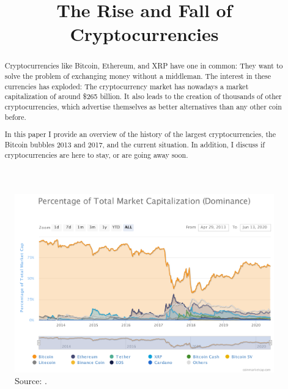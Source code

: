 \documentclass[11pt,a4paper,compsoc,conference]{IEEEtran}
\begin{document}
\title{\Huge{The Rise and Fall of Cryptocurrencies}}

\author{
}

\maketitle
\thispagestyle{plain}
\pagestyle{plain}


\begin{abstract}
Cryptocurrencies like Bitcoin, Ethereum, and XRP have one in common: They want to solve the problem of exchanging money without a middleman. The interest in these currencies has exploded: The cryptocurrency market has nowadays a market capitalization of around \$265 billion. It also leads to the creation of thousands of other cryptocurrencies, which advertise themselves as better alternatives than any other coin before. 

In this paper I provide an overview of the history of the largest cryptocurrencies, the Bitcoin bubbles 2013 and 2017, and the current situation. In addition, I discuss if cryptocurrencies are here to stay, or are going away soon. 

\end{abstract}

\begin{figure}
    \centering
    \includegraphics[width=\textwidth,draft=False]{figures/percentage-of-total-mark.pdf}
    \caption[Market Dominance]{Source: \citep{coinmarketcap}.}
    \label{fig:dominance}
\end{figure}
\end{document}
